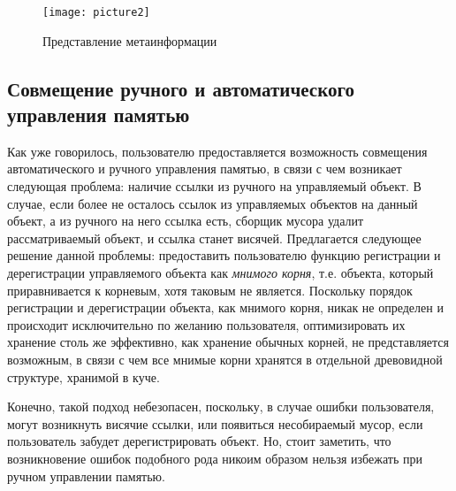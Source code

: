 \begin{figure}[h!]
	\centering
	\texttt{[image: picture2]}
	\caption{Представление метаинформации}
\end{figure}

\newpage
\subsection{Совмещение ручного и автоматического управления памятью}
Как уже говорилось, пользователю предоставляется возможность совмещения автоматического и ручного управления памятью,
в связи с чем возникает следующая проблема: наличие ссылки из ручного на управляемый объект.
В случае, если более не осталось ссылок из управляемых объектов на данный объект, а из ручного на него ссылка есть,
сборщик мусора удалит рассматриваемый объект, и ссылка станет висячей.
Предлагается следующее решение данной проблемы: предоставить пользователю функцию регистрации и дерегистрации управляемого объекта
как \textit{мнимого корня}, т.е. объекта, который приравнивается к корневым, хотя таковым не является.
Поскольку порядок регистрации и дерегистрации объекта, как мнимого корня, никак не определен и происходит исключительно по желанию пользователя, оптимизировать их хранение столь же эффективно, как хранение обычных корней, не представляется возможным,
в связи с чем все мнимые корни хранятся в отдельной древовидной структуре, хранимой в куче.

Конечно, такой подход небезопасен, поскольку, в случае ошибки пользователя, могут возникнуть висячие ссылки, или появиться несобираемый мусор, если пользователь забудет дерегистрировать объект.
Но, стоит заметить, что возникновение ошибок подобного рода никоим образом нельзя избежать при ручном управлении памятью.
